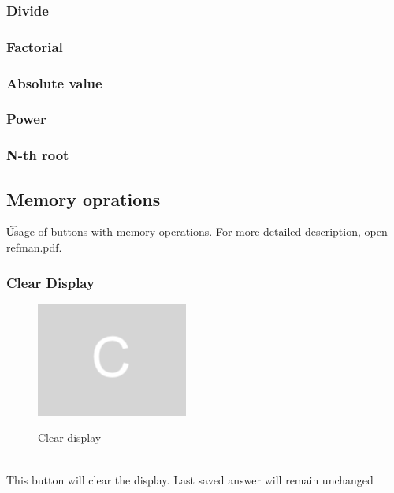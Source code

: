 \documentclass[11pt, a4paper]{article}
\begin{document}
    \subsubsection{Divide}
    \label{subsubsec:division}

    \subsubsection{Factorial}
    \label{subsubsec:factorial}

    \subsubsection{Absolute value}
    \label{subsubsec:absolutevalue}

    \subsubsection{Power}
    \label{subsubsec:power}

    \subsubsection{N-th root}
    \label{subsubsec:nthroot}

    \newpage

    \subsection{Memory oprations}
    \t Usage of buttons with memory operations.
    For more detailed description, open refman.pdf.
    \label{subsec:memoryoperations}

    \subsubsection{Clear Display }

    \label{subsubsec:cleardisplay}

    \begin{figure}[h]
        \caption{Clear display}
        \includegraphics[scale = 0.2]{clear_display}
        \centering
        \label{fig:ac}
    \end{figure}
    \\
    This button will clear the display. Last saved answer will remain unchanged
\end{document}
